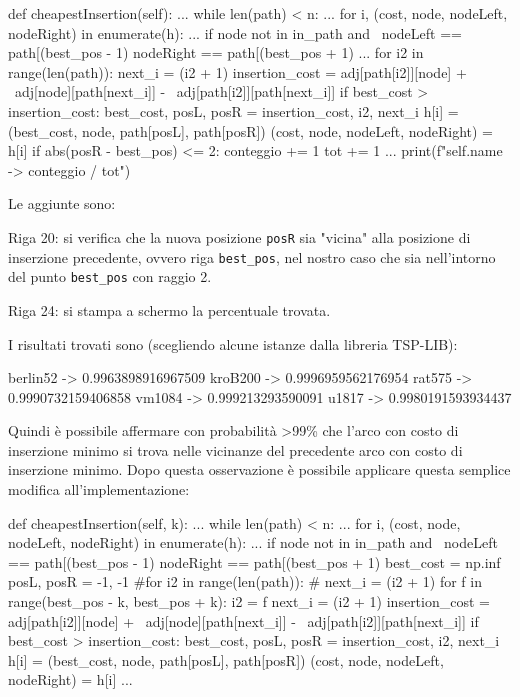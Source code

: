 \documentclass[a4paper,12pt]{report}
\begin{document}
\begin{python}
def cheapestInsertion(self):
  ...
  while len(path) < n:
    ...
    for i, (cost, node, nodeLeft, nodeRight) in enumerate(h):
      ...
      if node not in in_path and \
         nodeLeft == path[(best_pos - 1) %
         nodeRight == path[(best_pos + 1) %
        ...
        for i2 in range(len(path)):
          next_i = (i2 + 1) %
          insertion_cost = adj[path[i2]][node] + \
                           adj[node][path[next_i]] - \
                           adj[path[i2]][path[next_i]]
          if best_cost > insertion_cost:
            best_cost, posL, posR = insertion_cost, i2, next_i
        h[i] = (best_cost, node, path[posL], path[posR])
        (cost, node, nodeLeft, nodeRight) = h[i]
        if abs(posR - best_pos) <= 2:
          conteggio += 1
        tot += 1
  ...
  print(f"{self.name} -> {conteggio / tot}")
\end{python}
Le aggiunte sono:
\begin{legal}
  \item Riga 20: si verifica che la nuova posizione \lstinline!posR! sia "vicina" alla posizione di inserzione precedente, ovvero riga \lstinline!best_pos!, nel nostro caso che sia nell'intorno del punto \lstinline!best_pos! con raggio 2.
  \item Riga 24: si stampa a schermo la percentuale trovata.
\end{legal}
I risultati trovati sono (scegliendo alcune istanze dalla libreria TSP-LIB):
\begin{myverbatim}
berlin52 -> 0.9963898916967509
kroB200 -> 0.9996959562176954
rat575 -> 0.9990732159406858
vm1084 -> 0.999213293590091
u1817 -> 0.9980191593934437
\end{myverbatim}
Quindi è possibile affermare con probabilità \textgreater 99\% che l'arco con costo di inserzione minimo si trova nelle vicinanze del precedente arco con costo di inserzione minimo. Dopo questa osservazione è possibile applicare questa semplice modifica all'implementazione:
\begin{python}
def cheapestInsertion(self, k):
  ...
  while len(path) < n:
    ...
    for i, (cost, node, nodeLeft, nodeRight) in enumerate(h):
      ...
      if node not in in_path and \
         nodeLeft == path[(best_pos - 1) %
         nodeRight == path[(best_pos + 1) %
        best_cost = np.inf
        posL, posR = -1, -1
        #for i2 in range(len(path)):
        #  next_i = (i2 + 1) %
        for f in range(best_pos - k, best_pos + k):
          i2 = f %
          next_i = (i2 + 1) %
          insertion_cost = adj[path[i2]][node] + \
                           adj[node][path[next_i]] - \
                           adj[path[i2]][path[next_i]]
          if best_cost > insertion_cost:
            best_cost, posL, posR = insertion_cost, i2, next_i
        h[i] = (best_cost, node, path[posL], path[posR])
        (cost, node, nodeLeft, nodeRight) = h[i]
        ...
\end{python}
\end{document}
